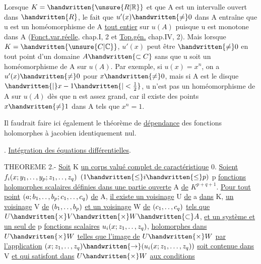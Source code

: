 Lorsque $K=\handwritten{\unsure{R|\mathbb{R}}}$ et que A est un intervalle ouvert dans $\handwritten{R}$, le fait que $u'(x)\handwritten{\neq}0$ dans A entraîne que u est un homéomorphisme de A \uline{tout entier} sur $u(A)$ puisque u est monotone dans A (\uline{Fonct.var.réelle}, chap.I, \handwritten{\S}2 et \uline{Top.gén.} chap.IV, \handwritten{\S}2). Mais lorsque $K=\handwritten{\unsure{C|\mathbb{C}}}$, $u'(x)$ peut être $\handwritten{\neq}0$ en tout point d'un domaine $A\handwritten{\subset C}$ sans que u soit un homéomorphisme de A sur $u(A)$. Par exemple, si $u(x)=x^n$, on a $u'(x)\handwritten{\neq}0$ pour $x\handwritten{\neq}0$, mais si A est le disque $\handwritten{|}x-1\handwritten{|<\frac{1}{2}}$, u n'est pas un homéomorphisme de A sur $u(A)$ dès que n est assez grand, car il existe des points $x\handwritten{\neq}1$ dans A tels que $x^n=1$.

Il faudrait faire ici également le théorème de \uline{dépendance} des fonctions holomorphes à jacobien identiquement nul.

. \uline{Intégration des équations différentielles}.

THEOREME 2.- \uline{Soit} K \uline{un corps valué complet de caractéristique} 0. \uline{Soient} $f_i(x;y_1,\mathinner{\ldotp\ldotp},y_p;z_1,\mathinner{\ldotp\ldotp},z_q)$ $(1\handwritten{\leq}i\handwritten{\leq}p)$ p \uline{fonctions holomorphes scalaires définies dans une partie ouverte} A \uline{de} $K^{p+q+1}$. \uline{Pour tout point} $(a;b_1,\mathinner{\ldotp\ldotp},b_p;c_1,\mathinner{\ldotp\ldotp},c_q)$ \uline{de} A, \uline{il existe un voisinage} U \uline{de} a \uline{dans} K, \uline{un voisinage} V \uline{de} $(b_1,\mathinner{\ldotp\ldotp},b_p)$ \uline{et un voisinage} W \uline{de} $(c_1,\mathinner{\ldotp\ldotp},c_q)$ \uline{tels que} $U\handwritten{\times}V\handwritten{\times}W\handwritten{\subset}A$, \uline{et un système et un seul de} p \uline{fonctions scalaires} $u_i(x;z_1,\mathinner{\ldotp\ldotp},z_q)$, \uline{holomorphes dans} $U\handwritten{\times}W$ \uline{telles que l'image de} $U\handwritten{\times}W$ \uline{par l'application} $(x;z_1,\mathinner{\ldotp\ldotp},z_q)\handwritten{\to}(u_i(x;z_1,\ldots,z_q))$ \uline{soit contenue dans} V \uline{et qui satisfont dans} $U\handwritten{\times}W$ \uline{aux conditions}
